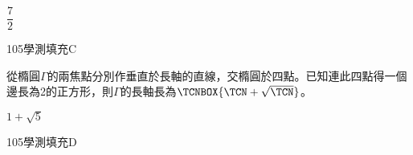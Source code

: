 \begin{QUESTIONS}
\begin{QUESTION}
\begin{QANS}
            $\dfrac{7}{2}$
        \end{QANS}
        \begin{QSOLLIST}
        \end{QSOLLIST}
        \begin{QEMPTYSPACE}
        \end{QEMPTYSPACE}
    \end{QUESTION}
    \begin{QUESTION}
        \begin{ExamInfo}{105}{學測}{填充}{C}
        \end{ExamInfo}
        \begin{ExamAnsRateInfo}{43}{85}{40}{4}
        \end{ExamAnsRateInfo}
        \begin{QBODY}
            從橢圓$\Gamma $的兩焦點分別作垂直於長軸的直線，交橢圓於四點。已知連此四點得一個邊長為2的正方形，則$\Gamma $的長軸長為$\TCNBOX{\TCN +\sqrt{\TCN}}$。
        \end{QBODY}
        \begin{QFROMS}
        \end{QFROMS}
        \begin{QTAGS}\end{QTAGS}
        \begin{QANS}
            $1+\sqrt{5}$
        \end{QANS}
        \begin{QSOLLIST}
        \end{QSOLLIST}
        \begin{QEMPTYSPACE}
        \end{QEMPTYSPACE}
    \end{QUESTION}
    \begin{QUESTION}
        \begin{ExamInfo}{105}{學測}{填充}{D}
        \end{ExamInfo}
        \begin{ExamAnsRateInfo}{51}{86}{56}{11}
        \end{ExamAnsRateInfo}
        \begin{QBODY}
            線性方程組$\left\{ \begin{aligned}
			 & x+2y+3z=0 \\ 
			 & 2x+y+3z=6 \\ 
			 & x-y=6 \\ 
			 & x-2y-z=8  
			\end{aligned} \right.$ 經高斯消去法計算後，其增廣矩陣可化簡為$\left[ \left. \begin{matrix}

\end{matrix}
\end{QBODY}
\end{QUESTION}
\end{QUESTIONS}
